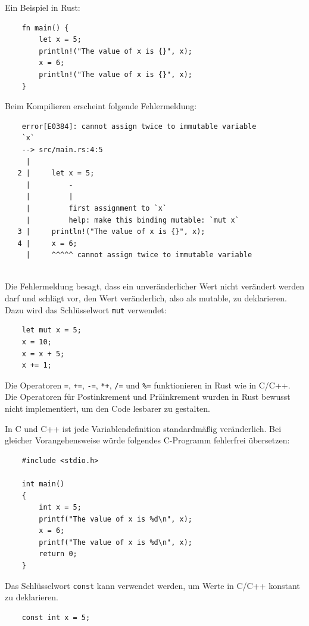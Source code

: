 Ein Beispiel in Rust:

\begin{lstlisting}
    fn main() {
        let x = 5;
        println!("The value of x is {}", x);
        x = 6;
        println!("The value of x is {}", x);
    }
\end{lstlisting}

Beim Kompilieren erscheint folgende Fehlermeldung:

\begin{lstlisting}
    error[E0384]: cannot assign twice to immutable variable 
    `x`
    --> src/main.rs:4:5
     |
   2 |     let x = 5;
     |         -
     |         |
     |         first assignment to `x`
     |         help: make this binding mutable: `mut x`
   3 |     println!("The value of x is {}", x);
   4 |     x = 6;
     |     ^^^^^ cannot assign twice to immutable variable
   
\end{lstlisting}

Die Fehlermeldung besagt, dass ein unveränderlicher Wert nicht verändert werden darf und schlägt vor, den Wert veränderlich, also als \glqq mutable\grqq{}, zu deklarieren. Dazu wird das Schlüsselwort \verb"mut" verwendet:

\begin{lstlisting}
    let mut x = 5;
    x = 10;
    x = x + 5;
    x += 1;
\end{lstlisting}

Die Operatoren \verb"=", \verb"+=", \verb"-=", \verb"*+", \verb"/=" und \verb"%=" funktionieren in Rust wie in C/C++. Die Operatoren für Postinkrement und Präinkrement wurden in Rust bewusst nicht implementiert, um den Code lesbarer zu gestalten.

In C und C++ ist jede Variablendefinition standardmäßig veränderlich. Bei glei\-cher Vorangehensweise würde folgendes C-Programm fehlerfrei übersetzen:

\begin{lstlisting}
    #include <stdio.h>

    int main()
    {
        int x = 5;
        printf("The value of x is %d\n", x);
        x = 6;
        printf("The value of x is %d\n", x);
        return 0;
    }    
\end{lstlisting}

Das Schlüsselwort \verb"const" kann verwendet werden, um Werte in C/C++ konstant zu deklarieren.

\begin{lstlisting}
    const int x = 5;
\end{lstlisting}

